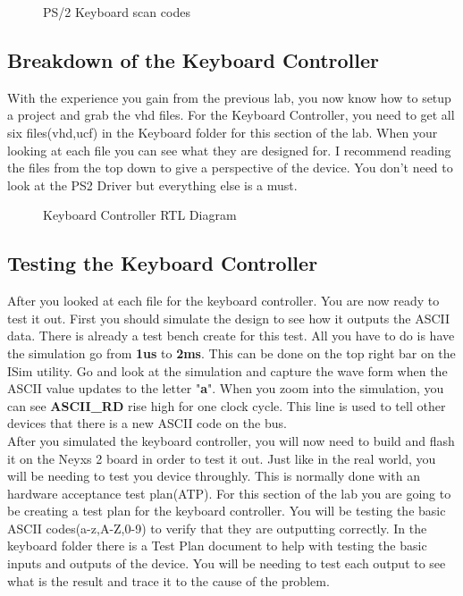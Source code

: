 \documentclass{article}
\begin{document}
\begin{figure}[!htbp]
  \centering
  \caption{PS/2 Keyboard scan codes}
\end{figure}

\newpage
\subsection{Breakdown of the Keyboard Controller}
With the experience you gain from the previous lab, you now know how to setup a project and grab the vhd files. For the Keyboard Controller, you need to get all six files(vhd,ucf) in the Keyboard folder for this section of the lab. When your looking at each file you can see what they are designed for. I recommend reading the files from the top down to give a perspective of the device. You don't need to look at the PS2 Driver but everything else is a must.

\begin{figure}[!htbp]
  \centering
  \caption{Keyboard Controller RTL Diagram}
\end{figure}

\subsection{Testing the Keyboard Controller}
After you looked at each file for the keyboard controller. You are now ready to test it out. First you should simulate the design to see how it outputs the ASCII data. There is already a test bench create for this test. All you have to do is have the simulation go from \textbf{1us} to \textbf{2ms}. This can be done on the top right bar on the ISim utility. Go and look at the simulation and capture the wave form when the ASCII value updates to the letter "\textbf{a}". When you zoom into the simulation, you can see \textbf{ASCII\_RD} rise high for one clock cycle. This line is used to tell other devices that there is a new ASCII code on the bus. \\

After you simulated the keyboard controller, you will now need to build and flash it on the Neyxs 2 board in order to test it out. Just like in the real world, you will be needing to test you device throughly. This is normally done with an hardware acceptance test plan(ATP). For this section of the lab you are going to be creating a test plan for the keyboard controller. You will be testing the basic ASCII codes(a-z,A-Z,0-9) to verify that they are outputting correctly. In the keyboard folder there is a Test Plan document to help with testing the basic inputs and outputs of the device. You will be needing to test each output to see what is the result and trace it to the cause of the problem.
\end{document}
